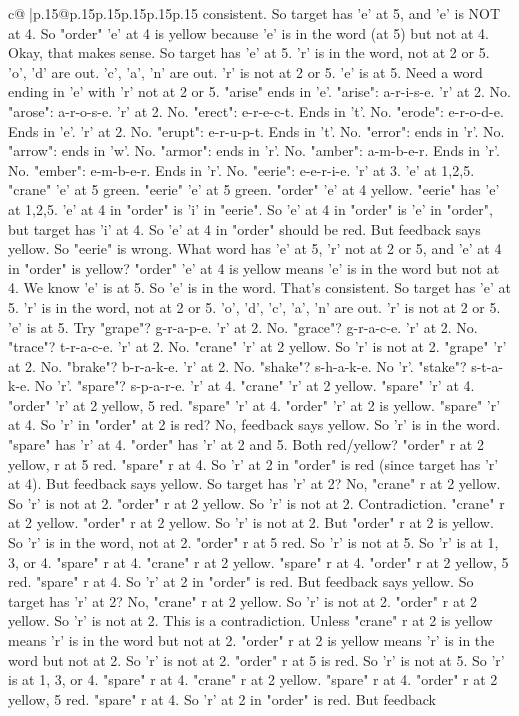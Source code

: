 \documentclass{article}
\begin{document}
{\begin{supertabular}{c@{$\;$}|p{.15\linewidth}@{}p{.15\linewidth}p{.15\linewidth}p{.15\linewidth}p{.15\linewidth}p{.15\linewidth}}
{{{consistent. So target has 'e' at 5, and 'e' is NOT at 4. So "order" 'e' at 4 is yellow because 'e' is in the word (at 5) but not at 4. Okay, that makes sense. So target has 'e' at 5. 'r' is in the word, not at 2 or 5. 'o', 'd' are out. 'c', 'a', 'n' are out. 'r' is not at 2 or 5. 'e' is at 5. Need a word ending in 'e' with 'r' not at 2 or 5. "arise" ends in 'e'. "arise": a{-}r{-}i{-}s{-}e. 'r' at 2. No. "arose": a{-}r{-}o{-}s{-}e. 'r' at 2. No. "erect": e{-}r{-}e{-}c{-}t. Ends in 't'. No. "erode": e{-}r{-}o{-}d{-}e. Ends in 'e'. 'r' at 2. No. "erupt": e{-}r{-}u{-}p{-}t. Ends in 't'. No. "error": ends in 'r'. No. "arrow": ends in 'w'. No. "armor": ends in 'r'. No. "amber": a{-}m{-}b{-}e{-}r. Ends in 'r'. No. "ember": e{-}m{-}b{-}e{-}r. Ends in 'r'. No. "eerie": e{-}e{-}r{-}i{-}e. 'r' at 3. 'e' at 1,2,5. "crane" 'e' at 5 green. "eerie" 'e' at 5 green. "order" 'e' at 4 yellow. "eerie" has 'e' at 1,2,5. 'e' at 4 in "order" is 'i' in "eerie". So 'e' at 4 in "order" is 'e' in "order", but target has 'i' at 4. So 'e' at 4 in "order" should be red. But feedback says yellow. So "eerie" is wrong. What word has 'e' at 5, 'r' not at 2 or 5, and 'e' at 4 in "order" is yellow? "order" 'e' at 4 is yellow means 'e' is in the word but not at 4. We know 'e' is at 5. So 'e' is in the word. That's consistent. So target has 'e' at 5. 'r' is in the word, not at 2 or 5. 'o', 'd', 'c', 'a', 'n' are out. 'r' is not at 2 or 5. 'e' is at 5. Try "grape"? g{-}r{-}a{-}p{-}e. 'r' at 2. No. "grace"? g{-}r{-}a{-}c{-}e. 'r' at 2. No. "trace"? t{-}r{-}a{-}c{-}e. 'r' at 2. No. "crane" 'r' at 2 yellow. So 'r' is not at 2. "grape" 'r' at 2. No. "brake"? b{-}r{-}a{-}k{-}e. 'r' at 2. No. "shake"? s{-}h{-}a{-}k{-}e. No 'r'. "stake"? s{-}t{-}a{-}k{-}e. No 'r'. "spare"? s{-}p{-}a{-}r{-}e. 'r' at 4. "crane" 'r' at 2 yellow. "spare" 'r' at 4. "order" 'r' at 2 yellow, 5 red. "spare" 'r' at 4. "order" 'r' at 2 is yellow. "spare" 'r' at 4. So 'r' in "order" at 2 is red? No, feedback says yellow. So 'r' is in the word. "spare" has 'r' at 4. "order" has 'r' at 2 and 5. Both red/yellow? "order" r at 2 yellow, r at 5 red. "spare" r at 4. So 'r' at 2 in "order" is red (since target has 'r' at 4). But feedback says yellow. So target has 'r' at 2? No, "crane" r at 2 yellow. So 'r' is not at 2. "order" r at 2 yellow. So 'r' is not at 2. Contradiction. "crane" r at 2 yellow. "order" r at 2 yellow. So 'r' is not at 2. But "order" r at 2 is yellow. So 'r' is in the word, not at 2. "order" r at 5 red. So 'r' is not at 5. So 'r' is at 1, 3, or 4. "spare" r at 4. "crane" r at 2 yellow. "spare" r at 4. "order" r at 2 yellow, 5 red. "spare" r at 4. So 'r' at 2 in "order" is red. But feedback says yellow. So target has 'r' at 2? No, "crane" r at 2 yellow. So 'r' is not at 2. "order" r at 2 yellow. So 'r' is not at 2. This is a contradiction. Unless "crane" r at 2 is yellow means 'r' is in the word but not at 2. "order" r at 2 is yellow means 'r' is in the word but not at 2. So 'r' is not at 2. "order" r at 5 is red. So 'r' is not at 5. So 'r' is at 1, 3, or 4. "spare" r at 4. "crane" r at 2 yellow. "spare" r at 4. "order" r at 2 yellow, 5 red. "spare" r at 4. So 'r' at 2 in "order" is red. But feedback }}}
\end{supertabular}}
\end{document}
